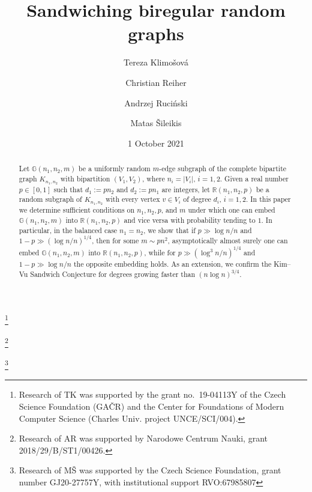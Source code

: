 \documentclass[12pt,reqno]{amsart}
\newcommand{\R} {\mathbb R}
\newcommand{\Rnnp}{\R(n_1,n_2,p)}
\newcommand{\G} {\mathbb G}
\newcommand{\Gnnm} {\G(n_1,n_2,m)}
\newcommand{\Knn} {K_{n_1,n_2}}
\theoremstyle{definition}
\begin{document}
\title{Sandwiching biregular random graphs}
\author{Tereza Klimo\v{s}ov\'{a}}
\address{Tereza Klimo\v{s}ov\'{a} \\ Faculty of Mathematics and Physics \\ Charles University \\ Prague, Czech Republic.}
\thanks{Research of TK was supported by the grant no.~19-04113Y of the Czech
Science Foundation (GA\v{C}R) and the Center for Foundations of Modern Computer Science (Charles Univ. project UNCE/SCI/004).}
\author{Christian Reiher}
\address{Christian Reiher, Fachbereich Mathematik, Universit\"at Hamburg, Hamburg, Germany.}
\author{Andrzej Ruci\'nski}
\address{Andrzej Ruci\'nski \\ Faculty of Mathematics and Computer Science \\ Adam Mickiewicz University \\
Pozna\'n, Poland.}
 \thanks{Research of AR was supported by Narodowe Centrum Nauki, grant 2018/29/B/ST1/00426.}
\author{Matas \v{S}ileikis}
\address{Matas \v{S}ileikis \\ The Czech Academy of Sciences \\ Institute of Computer Science \\ Prague, Czech Republic.}
\thanks{Research of M\v{S} was supported by the Czech Science Foundation, grant number GJ20-27757Y, with institutional support RVO:67985807}
\date{1 October 2021%
}

\begin{abstract}
	Let $\Gnnm$ be a uniformly random $m$-edge subgraph of the complete bipartite graph $\Knn$ with bipartition $(V_1, V_2)$, where $n_i = |V_i|$, $i=1,2$. Given a real number $p \in [0,1]$ such that $d_1 := pn_2$ and $d_2 := pn_1$ are integers, let $\Rnnp$ be a random subgraph of $\Knn$ with every vertex $v \in V_i$ of degree $d_i$,  $i = 1, 2$. In this paper we determine sufficient conditions on $n_1,n_2,p$, and $m$ under which one can embed $\Gnnm$ into $\Rnnp$ and vice versa with probability tending to $1$.
 In particular, in the balanced case $n_1=n_2$, we show that if $p\gg\log n/n$ and $1 - p \gg \left(\log n/n \right)^{1/4}$,
 then for some $m\sim pn^2$, asymptotically almost surely one can embed $\Gnnm$ into $\Rnnp$, while for  $p\gg\left(\log^{3} n/n\right)^{1/4}$ and $1-p\gg\log n/n$  the opposite embedding holds. As an extension, we confirm the Kim--Vu Sandwich Conjecture for degrees growing faster than $(n \log n)^{3/4}$.
\end{abstract}
\end{document}
